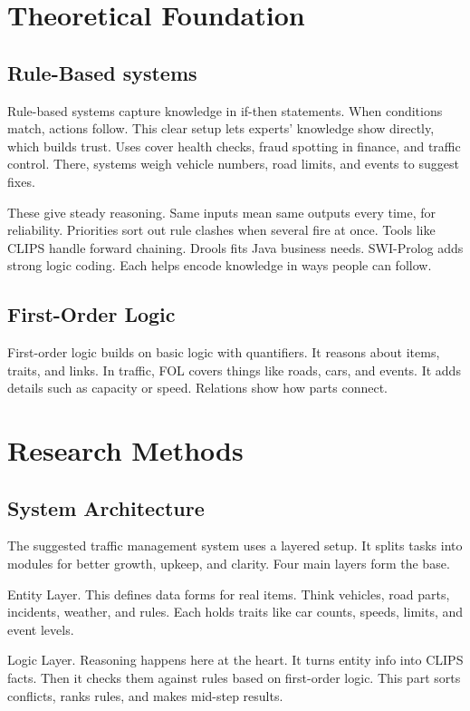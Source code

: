 \documentclass{article}
\begin{document}
\section{Theoretical Foundation}

\subsection{Rule-Based systems}

Rule-based systems capture knowledge in if-then statements. When conditions match, actions follow. This clear setup lets experts' knowledge show directly, which builds trust. Uses cover health checks, fraud spotting in finance, and traffic control. There, systems weigh vehicle numbers, road limits, and events to suggest fixes.

These give steady reasoning. Same inputs mean same outputs every time, for reliability. Priorities sort out rule clashes when several fire at once. Tools like CLIPS handle forward chaining. Drools fits Java business needs. SWI-Prolog adds strong logic coding. Each helps encode knowledge in ways people can follow.

\subsection{First-Order Logic}

First-order logic builds on basic logic with quantifiers. It reasons about items, traits, and links. In traffic, FOL covers things like roads, cars, and events. It adds details such as capacity or speed. Relations show how parts connect.

\section{Research Methods}

\subsection{System Architecture}

The suggested traffic management system uses a layered setup. It splits tasks into modules for better growth, upkeep, and clarity. Four main layers form the base.

Entity Layer. This defines data forms for real items. Think vehicles, road parts, incidents, weather, and rules. Each holds traits like car counts, speeds, limits, and event levels.

Logic Layer. Reasoning happens here at the heart. It turns entity info into CLIPS facts. Then it checks them against rules based on first-order logic. This part sorts conflicts, ranks rules, and makes mid-step results.
\end{document}

